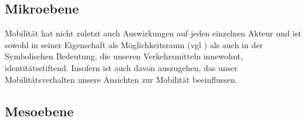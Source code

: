 \subsection{Mikroebene}
Mobilität hat nicht zuletzt auch Auswirkungen auf jeden einzelnen Akteur und ist sowohl in seiner Eigenschaft als Möglichkeitsraum (vgl \cite{riessman}) als auch in der Symbolischen Bedeutung, die unseren Verkehrsmitteln innewohnt, identitätsstiftend.
Insofern ist auch davon auszugehen, das unser Mobilitätsverhalten unsere Ansichten zur Mobilität beeinflussen.

\subsection{Mesoebene}



